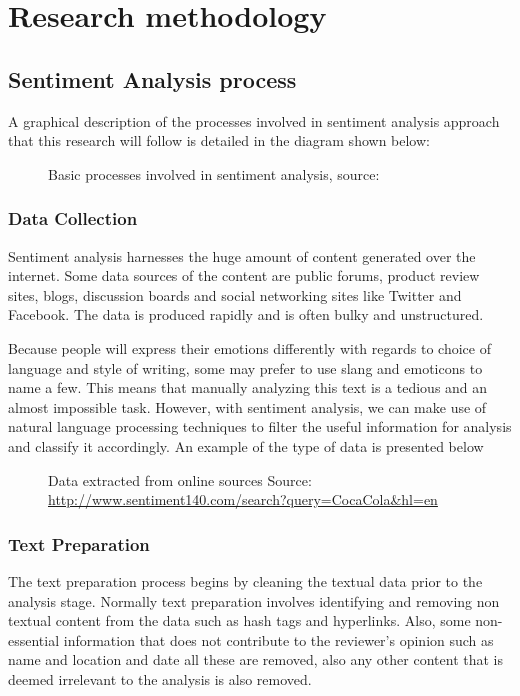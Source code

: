 \chapter{Research methodology}
\section{Sentiment Analysis process}
A graphical description of the processes involved in sentiment analysis approach that this research will follow is detailed in the diagram shown below:

\begin{figure}[h]
  \centering
  \caption[Sentiment analysis process]
  {Basic processes involved in sentiment analysis, source:\cite{ref49}}
  \label{fig:ALAP:sm3}
\end{figure}
\label{research_methodology}


\subsection{Data Collection}
Sentiment analysis harnesses the huge amount of content generated over the internet. Some data sources of the content are public forums, product review sites, blogs, discussion boards and social networking sites like Twitter and Facebook.
The data is produced rapidly and is often bulky and unstructured.

Because people will express their emotions differently with regards to choice of language and style of writing, some may prefer to use slang and emoticons to name a few. This means that manually analyzing this text is a tedious and an almost impossible task.
\clearpage
However, with sentiment analysis, we can make use of natural language processing techniques to filter the useful information for analysis and classify it accordingly. An example of the type of data is presented below



\begin{figure}[h]
  \centering
  \caption[sample tweets]
  {Data extracted from online sources Source: \url{http://www.sentiment140.com/search?query=CocaCola&hl=en}  }
  \label{fig:ALAP:sm1}
\end{figure}



\subsection{Text Preparation}
The text preparation process begins by cleaning the textual data prior to the analysis stage. Normally text preparation involves identifying and removing non textual content from the data such as hash tags and hyperlinks. Also, some non-essential information that does not contribute to the reviewer's opinion such as name and location and date all these are removed, also any other content that is deemed irrelevant to the analysis is also removed.


